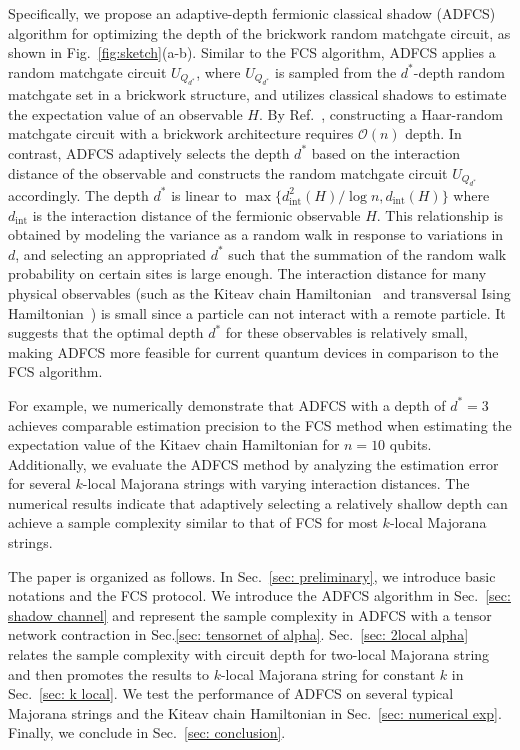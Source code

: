 \documentclass[showpacs,twocolumn,aps,prx,long bibliography,superscriptaddress,notitlepage]{revtex4-1}
\newcommand{\cbra}[1]{\{ #1 \}}
\begin{document}
Specifically, we propose an adaptive-depth fermionic classical shadow (ADFCS) algorithm for optimizing the depth of the brickwork random matchgate circuit, as shown in Fig.~\ref{fig:sketch}(a-b). 
Similar to the FCS algorithm, ADFCS applies a random matchgate circuit $U_{Q_{d^\ast}}$, where $U_{Q_{d^\ast}}$ is sampled from the $d^\ast$-depth random matchgate set in a brickwork structure, and utilizes classical shadows to estimate the expectation value of an observable $H$. 
By Ref.~\cite{Jiang18Quantum}, constructing a Haar-random matchgate circuit with a brickwork architecture requires $\mathcal{O}(n)$ depth. In contrast, ADFCS adaptively selects the depth $d^\ast$ based on the interaction distance of the observable and constructs the random matchgate circuit $U_{Q_{d^\ast}}$ accordingly.
The depth $d^\ast$ is linear to $\max\cbra{d^2_{\text{int}}(H)/\log n, d_{\text{int}}(H)}$ where $d_{\text{int}}$ is the interaction distance of the fermionic observable $H$. This relationship is obtained by modeling the variance as a random walk in response to variations in $d$, and selecting an appropriated $d^\ast$ such that the summation of the random walk probability on certain sites is large enough. 
The interaction distance for many physical observables (such as the Kiteav chain Hamiltonian~\cite{greiter20141d, borla2021gauging} and transversal Ising Hamiltonian~\cite{greiter20141d, marsolais2021equivalence}) is small since a particle can not interact with a remote particle. It suggests that the optimal depth $d^\ast$ for these observables is relatively small, making ADFCS more feasible for current quantum devices in comparison to the FCS algorithm. 


For example, we numerically demonstrate that ADFCS with a depth of $d^\ast = 3$ achieves comparable estimation precision to the FCS method when estimating the expectation value of the Kitaev chain Hamiltonian for $n=10$ qubits. 
Additionally, we evaluate the ADFCS method by analyzing the estimation error for several $k$-local  Majorana strings with varying interaction distances. The numerical results indicate that adaptively selecting a relatively shallow depth can achieve a sample complexity similar to that of FCS for most $k$-local Majorana strings.

The paper is organized as follows. In Sec.~\ref{sec: preliminary}, we introduce basic notations and the FCS protocol. We introduce the ADFCS algorithm in Sec.~\ref{sec: shadow channel} and represent the sample complexity in ADFCS with a tensor network contraction in Sec.\ref{sec: tensornet of alpha}. Sec.~\ref{sec: 2local alpha} relates the sample complexity with circuit depth for two-local Majorana string and then promotes the results to $k$-local Majorana string for constant $k$ in Sec.~\ref{sec: k local}. We test the performance of ADFCS on several typical Majorana strings and the Kiteav chain Hamiltonian in Sec.~\ref{sec: numerical exp}. Finally, we conclude in Sec.~\ref{sec: conclusion}.
\end{document}
